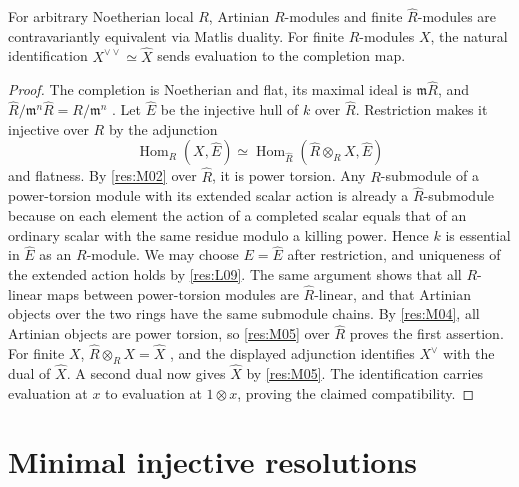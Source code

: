 \begin{theorem}\label{res:M06}
For arbitrary Noetherian local $R$, Artinian $R$-modules and finite
$\widehat R$-modules are contravariantly equivalent via Matlis duality.
For finite $R$-modules $X$, the natural identification
$X^{\vee\vee}\simeq \widehat X$ sends evaluation to the completion map.
\end{theorem}
\begin{proof}
The completion is Noetherian and flat, its maximal ideal is
$\mathfrak m\widehat R$, and
$\widehat R/\mathfrak m^n\widehat R=R/\mathfrak m^n$
\cite[ALG-05-C04-S01]{p103}. Let $\widehat E$ be the injective hull
of $k$ over $\widehat R$. Restriction makes it injective over $R$ by
the adjunction
\[
 \operatorname{Hom}_R(X,\widehat E)
 \simeq\operatorname{Hom}_{\widehat R}
       (\widehat R\otimes_R X,\widehat E)
\]
and flatness. By \ref{res:M02} over $\widehat R$, it is power torsion.
Any $R$-submodule of a power-torsion module with its extended scalar
action is already a $\widehat R$-submodule because on each element the action
of a completed scalar equals that of an ordinary scalar with the same
residue modulo a killing power. Hence $k$ is essential in $\widehat E$
as an $R$-module. We may choose $E=\widehat E$ after restriction, and
uniqueness of the extended action holds by \ref{res:L09}. The same
argument shows that all $R$-linear maps between power-torsion modules
are $\widehat R$-linear, and that Artinian objects over the two rings
have the same submodule chains. By \ref{res:M04}, all Artinian objects
are power torsion, so \ref{res:M05} over $\widehat R$ proves the first
assertion. For finite $X$, $\widehat R\otimes_R X=\widehat X$
\cite[ALG-05-C04-R03]{p103}, and the displayed adjunction identifies
$X^\vee$ with the dual of $\widehat X$. A second dual now gives
$\widehat X$ by \ref{res:M05}. The identification carries evaluation
at $x$ to evaluation at $1\otimes x$, proving the claimed compatibility.
\end{proof}

\section{Minimal injective resolutions}

